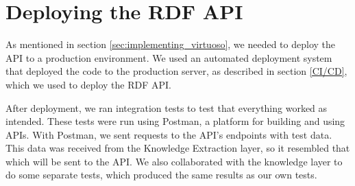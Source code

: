 \section{Deploying the RDF API}
As mentioned in section \ref{sec:implementing_virtuoso}, we needed to deploy the API to a production environment.
We used an automated deployment system that deployed the code to the production server, as described in section \ref{CI/CD}, which we used to deploy the RDF API.

After deployment, we ran integration tests to test that everything worked as intended. These tests were run using Postman, a platform for building and using APIs\cite{PostmanAPIPlatform}. With Postman, we sent requests to the API's endpoints with \knox{} test data. This data was received from the Knowledge Extraction layer, so it resembled that which will be sent to the API.
We also collaborated with the knowledge layer to do some separate tests, which produced the same results as our own tests.
